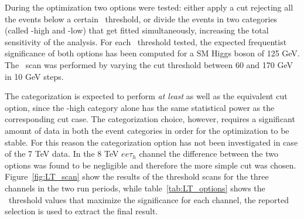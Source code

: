 During the optimization two options were tested: either apply a cut rejecting all the events below a certain \LT\ threshold, or divide the events in two categories (called \LT-high and \LT-low) that get fitted simultaneously, increasing the total sensitivity of the analysis. 
For each \LT \ threshold tested, the expected frequentist significance of both options has been computed for a SM Higgs boson of 125 GeV. The \LT\ scan was performed by varying the cut threshold between 60 and 170 GeV in 10 GeV steps. 

The categorization is expected to perform \emph{at least} as well as the equivalent cut option, since the \LT-high category alone has the same statistical power as the corresponding cut case. The categorization choice, however, requires a significant amount of data in both the event categories in order for the optimization to be stable. For this reason the categorization option has not been investigated in case of the 7 TeV data. In the 8 TeV $ee\tau_h$ channel the difference between the two options was found to be negligible and therefore the more simple cut was chosen. Figure~\ref{fig:LT_scan} show the results of the threshold scans for the three channels in the two run periods, while table~\ref{tab:LT_options} shows the \LT\ threshold values that maximize the significance for each channel, the reported selection is used to extract the final result.

